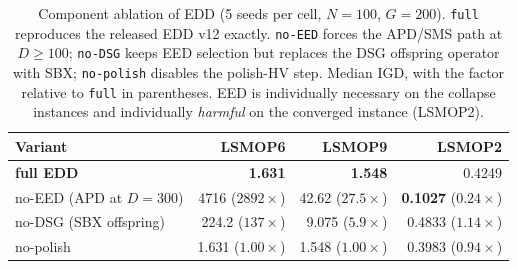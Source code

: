 \begin{table}[t]
\centering
\caption{Component ablation of EDD (5 seeds per cell, $N=100$, $G=200$).
\texttt{full} reproduces the released EDD v12 exactly. \texttt{no-EED}
forces the APD/SMS path at $D\ge100$; \texttt{no-DSG} keeps EED selection but
replaces the DSG offspring operator with SBX; \texttt{no-polish} disables the
polish-HV step. Median IGD, with the factor relative to \texttt{full} in
parentheses. EED is individually necessary on the collapse instances and
individually \emph{harmful} on the converged instance (LSMOP2).}
\label{tab:ablation}
\begin{tabular}{lrrr}
\toprule
Variant & LSMOP6 & LSMOP9 & LSMOP2 \\
\midrule
\textbf{full EDD}      & \textbf{1.631} & \textbf{1.548} & 0.4249 \\
no-EED (APD at $D{=}300$) & 4716 ($2892\times$) & 42.62 ($27.5\times$) & \textbf{0.1027} ($0.24\times$) \\
no-DSG (SBX offspring) & 224.2 ($137\times$) & 9.075 ($5.9\times$) & 0.4833 ($1.14\times$) \\
no-polish              & 1.631 ($1.00\times$) & 1.548 ($1.00\times$) & 0.3983 ($0.94\times$) \\
\bottomrule
\end{tabular}
\end{table}


